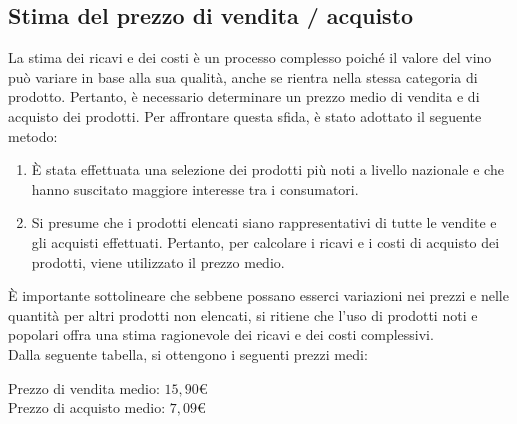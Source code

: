 \documentclass[12pt, a4paper]{article}
\newcommand{\meskip}{\medskip \\}
\begin{document}
\subsection{Stima del prezzo di vendita / acquisto}
La stima dei ricavi e dei costi è un processo complesso poiché il valore del vino può variare in base alla sua qualità, anche se rientra nella stessa categoria di prodotto. Pertanto, è necessario determinare un prezzo medio di vendita e di acquisto dei prodotti. Per affrontare questa sfida, è stato adottato il seguente metodo:
\begin{enumerate}
    \item È stata effettuata una selezione dei prodotti più noti a livello nazionale e che hanno suscitato maggiore interesse tra i consumatori.
    \item Si presume che i prodotti elencati siano rappresentativi di tutte le vendite e gli acquisti effettuati. Pertanto, per calcolare i ricavi e i costi di acquisto dei prodotti, viene utilizzato il prezzo medio.
\end{enumerate}
È importante sottolineare che sebbene possano esserci variazioni nei prezzi e nelle quantità per altri prodotti non elencati, si ritiene che l'uso di prodotti noti e popolari offra una stima ragionevole dei ricavi e dei costi complessivi.\meskip
Dalla seguente tabella, si ottengono i seguenti prezzi medi:
\begin{center}
    Prezzo di vendita medio: $15,90$€\\
    Prezzo di acquisto medio: $7,09$€
\end{center}
\end{document}
